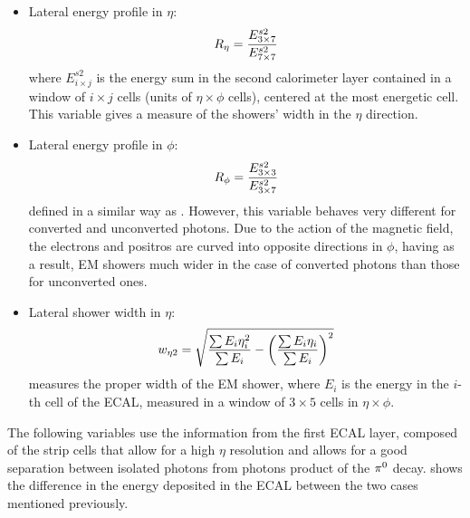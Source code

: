 \begin{itemize}
    \item Lateral energy profile in \(\eta\):
        \begin{equation}
            R_{\eta} = \frac{E_{3\times7}^{s2}}{E_{7\times7}^{s2}}
        \end{equation}
        where \(E_{i\times j}^{s2}\) is the energy sum in the second calorimeter layer contained in a window of \(i \times j \) cells (units of \(\eta \times \phi\) cells), centered at the most energetic cell. This variable gives a measure of the showers' width in the \(\eta\) direction.
    \item Lateral energy profile in \(\phi\):
        \begin{equation}
            R_{\phi} = \frac{E_{3\times3}^{s2}}{E_{3\times7}^{s2}}
        \end{equation}
        defined in a similar way as \reta. However, this variable behaves very different for converted and unconverted photons. Due to the action of the magnetic field, the electrons and positros are curved into opposite directions in \(\phi\), having as a result, \ac{EM} showers much wider in the case of converted photons than those for unconverted ones.
    \item Lateral shower width in \(\eta\):
        \begin{equation}
            w_{\eta 2} = \sqrt{
                \frac{\sum E_i \eta_i^2}{\sum E_i}
                -
                \left(\frac{\sum E_i \eta_i}{\sum E_i}\right)^2
            }
        \end{equation}
        measures the proper width of the \ac{EM} shower, where \(E_i\) is the energy in the \(i\)-th cell of the \ac{ECAL}, measured in a window of \(3\times 5 \) cells in \(\eta \times \phi\).
\end{itemize}
The following variables use the information from the first \ac{ECAL} layer, composed of the strip cells that allow for a high \(\eta\) resolution and allows for a good separation between isolated photons from photons product of the \(\pi^{0}\) decay. \Fig{\ref{fig:pid_ss:ss:pizero}} shows the difference in the energy deposited in the \ac{ECAL} between the two cases mentioned previously.
